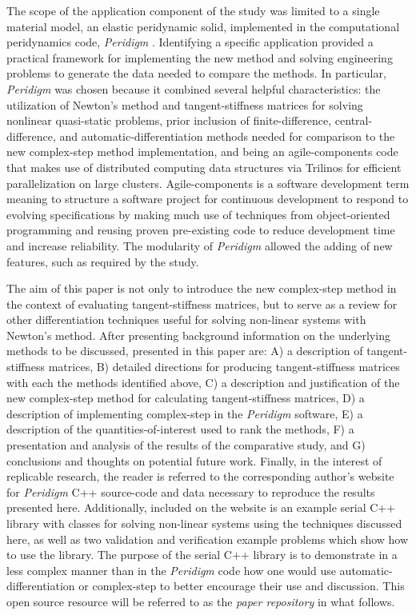 \documentclass[preprint,12pt]{elsarticle}
\begin{document}
The scope of the application component of the study was limited to a single material model, an elastic peridynamic solid, implemented in the computational peridynamics code, \textit{Peridigm} \cite{peridigm}. Identifying a specific application provided a practical framework for implementing the new method and solving engineering problems to generate the data needed to compare the methods. In particular, \emph{Peridigm} was chosen because it combined several helpful characteristics: the utilization of Newton's method and tangent-stiffness matrices for solving nonlinear quasi-static problems, prior inclusion of finite-difference, central-difference, and automatic-differentiation methods needed for comparison to the new complex-step method implementation, and being an agile-components code that makes use of distributed computing data structures via Trilinos \cite{trilinos} for efficient parallelization on large clusters. Agile-components is a software development term meaning to structure a software project for continuous development to respond to evolving specifications by making much use of techniques from object-oriented programming and reusing proven pre-existing code to reduce development time and increase reliability. The modularity of \emph{Peridigm} allowed the adding of new features, such as required by the study.

The aim of this paper is not only to introduce the new complex-step method in the context of evaluating tangent-stiffness matrices, but to serve as a review for other differentiation techniques useful for solving non-linear systems with Newton's method. After presenting background information on the underlying methods to be discussed, presented in this paper are: A) a description of tangent-stiffness matrices, B) detailed directions for producing tangent-stiffness matrices with each the methods identified above, C) a description and justification of the new complex-step method for calculating tangent-stiffness matrices, D) a description of implementing complex-step in the \emph{Peridigm} software, E) a description of the quantities-of-interest used to rank the methods, F) a presentation and analysis of the results of the comparative study, and G) conclusions and thoughts on potential future work. Finally, in the interest of replicable research, the reader is referred to the corresponding author's website for \emph{Peridigm} C++ source-code and data necessary to reproduce the results presented here. Additionally, included on the website is an example serial C++ library with classes for solving non-linear systems using the techniques discussed here, as well as two validation and verification example problems which show how to use the library. The purpose of the serial C++ library is to demonstrate in a less complex manner than in the \emph{Peridigm} code how one would use automatic-differentiation or complex-step to better encourage their use and discussion. This open source resource will be referred to as the \emph{paper repository} in what follows.
\end{document}
